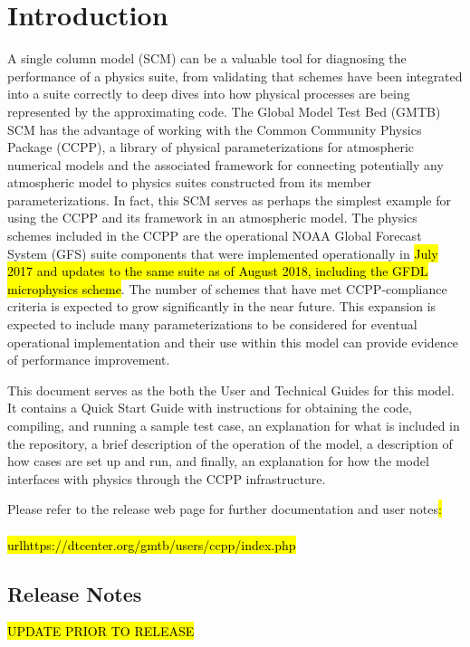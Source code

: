 \chapter{Introduction}
\label{chapter: introduction}

A single column model (SCM) can be a valuable tool for diagnosing the performance of a physics suite, from validating that schemes have been integrated into a suite correctly to deep dives into how physical processes are being represented by the approximating code. The Global Model Test Bed (GMTB) SCM has the advantage of working with the Common Community Physics Package (CCPP), a library of physical parameterizations for atmospheric numerical models and the associated framework for connecting potentially any atmospheric model to physics suites constructed from its member parameterizations. In fact, this SCM serves as perhaps the simplest example for using the CCPP and its framework in an atmospheric model. The physics schemes included in the CCPP are the operational NOAA Global Forecast System (GFS) suite components that were implemented operationally in \hl{July 2017 and updates to the same suite as of August 2018, including the GFDL microphysics scheme}. The number of schemes that have met CCPP-compliance criteria is expected to grow significantly in the near future. This expansion is expected to include many parameterizations to be considered for eventual operational implementation and their use within this model can provide evidence of performance improvement.

This document serves as the both the User and Technical Guides for this model. It contains a Quick Start Guide with instructions for obtaining the code, compiling, and running a sample test case, an explanation for what is included in the repository, a brief description of the operation of the model, a description of how cases are set up and run, and finally, an explanation for how the model interfaces with physics through the CCPP infrastructure.

Please refer to the release web page for further documentation and user notes\hl{:\\ \\url{https://dtcenter.org/gmtb/users/ccpp/index.php}}

\section{Release Notes}

\hl{UPDATE PRIOR TO RELEASE}

